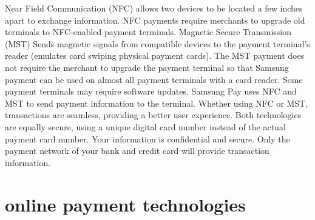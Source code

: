\documentclass[journal]{IEEEtran}
\begin{document}
Near Field Communication (NFC) allows two devices to be located a few inches apart to exchange information. NFC payments require merchants to upgrade old terminals to NFC-enabled payment terminals. Magnetic Secure Transmission (MST) Sends magnetic signals from compatible devices to the payment terminal's reader (emulates card swiping physical payment cards). The MST payment does not require the merchant to upgrade the payment terminal so that Samsung payment can be used on almost all payment terminals with a card reader. Some payment terminals may require software updates. Samsung Pay uses NFC and MST to send payment information to the terminal. Whether using NFC or MST, transactions are seamless, providing a better user experience. Both technologies are equally secure, using a unique digital card number instead of the actual payment card number. Your information is confidential and secure. Only the payment network of your bank and credit card will provide transaction information.




\section{online payment technologies}
\end{document}
